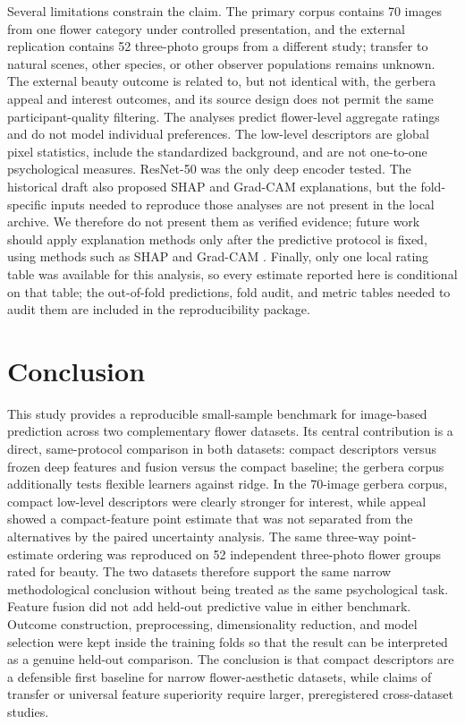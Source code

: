 \documentclass[10pt,letterpaper]{article}
\begin{document}
Several limitations constrain the claim. The primary corpus contains 70 images from one flower category under controlled presentation, and the external replication contains 52 three-photo groups from a different study; transfer to natural scenes, other species, or other observer populations remains unknown. The external beauty outcome is related to, but not identical with, the gerbera appeal and interest outcomes, and its source design does not permit the same participant-quality filtering. The analyses predict flower-level aggregate ratings and do not model individual preferences. The low-level descriptors are global pixel statistics, include the standardized background, and are not one-to-one psychological measures. ResNet-50 was the only deep encoder tested. The historical draft also proposed SHAP and Grad-CAM explanations, but the fold-specific inputs needed to reproduce those analyses are not present in the local archive. We therefore do not present them as verified evidence; future work should apply explanation methods only after the predictive protocol is fixed, using methods such as SHAP and Grad-CAM \cite{lundberg2017,lundberg2020,selvaraju2017}. Finally, only one local rating table was available for this analysis, so every estimate reported here is conditional on that table; the out-of-fold predictions, fold audit, and metric tables needed to audit them are included in the reproducibility package.


\section*{Conclusion}
This study provides a reproducible small-sample benchmark for image-based prediction across two complementary flower datasets. Its central contribution is a direct, same-protocol comparison in both datasets: compact descriptors versus frozen deep features and fusion versus the compact baseline; the gerbera corpus additionally tests flexible learners against ridge. In the 70-image gerbera corpus, compact low-level descriptors were clearly stronger for interest, while appeal showed a compact-feature point estimate that was not separated from the alternatives by the paired uncertainty analysis. The same three-way point-estimate ordering was reproduced on 52 independent three-photo flower groups rated for beauty. The two datasets therefore support the same narrow methodological conclusion without being treated as the same psychological task. Feature fusion did not add held-out predictive value in either benchmark. Outcome construction, preprocessing, dimensionality reduction, and model selection were kept inside the training folds so that the result can be interpreted as a genuine held-out comparison. The conclusion is that compact descriptors are a defensible first baseline for narrow flower-aesthetic datasets, while claims of transfer or universal feature superiority require larger, preregistered cross-dataset studies.
\end{document}
